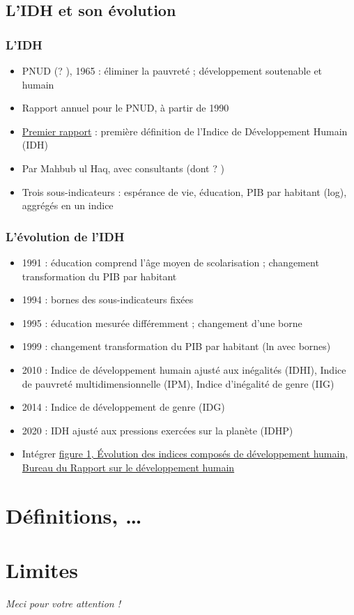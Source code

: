 \documentclass[french]{beamer}
\begin{document}
\subsection{L’IDH et son évolution}
\begin{frame}
	\frametitle{L’IDH}
	\begin{itemize}
		\item PNUD (? ), 1965 : éliminer la pauvreté ; développement soutenable et humain
		\item Rapport annuel pour le PNUD, à partir de 1990
		\item \href{https://hdr.undp.org/content/human-development-report-1990}{Premier rapport} : première définition de l’Indice de Développement Humain (IDH)
		\item Par Mahbub ul Haq, avec consultants (dont ? \onslide<2->{Amartya Sen})
		\item Trois sous-indicateurs : espérance de vie, éducation, PIB par habitant (log), aggrégés en un indice
	\end{itemize}
\end{frame}

\begin{frame}
	\frametitle{L’évolution de l’IDH}
	\begin{itemize}
		\item 1991 : éducation comprend l’âge moyen de scolarisation ; changement transformation du PIB par habitant
		\item 1994 : bornes des sous-indicateurs fixées
		\item 1995 : éducation mesurée différemment ; changement d’une borne
		\item 1999 : changement transformation du PIB par habitant (ln avec bornes)
		\item 2010 : Indice de développement humain ajusté aux inégalités (IDHI), Indice de pauvreté multidimensionnelle (IPM), Indice d’inégalité de genre (IIG)
		\item 2014 : Indice de développement de genre (IDG)
		\item 2020 : IDH ajusté aux pressions exercées sur la planète (IDHP) %
    \item Intégrer \href{https://hdr.undp.org/system/files/documents/2018humandevelopmentstatisticalupdatefr.pdf}{figure 1, Évolution des indices composés de développement humain, Bureau du Rapport sur le développement humain}
	\end{itemize}
\end{frame}

\section{Définitions, …}

\section{Limites}

\begin{frame}[plain]
	\addtocounter{framenumber}{-1}
	\begin{center}
		\huge
		\textit{Meci pour votre attention !}
	\end{center}
\end{frame}
\end{document}
